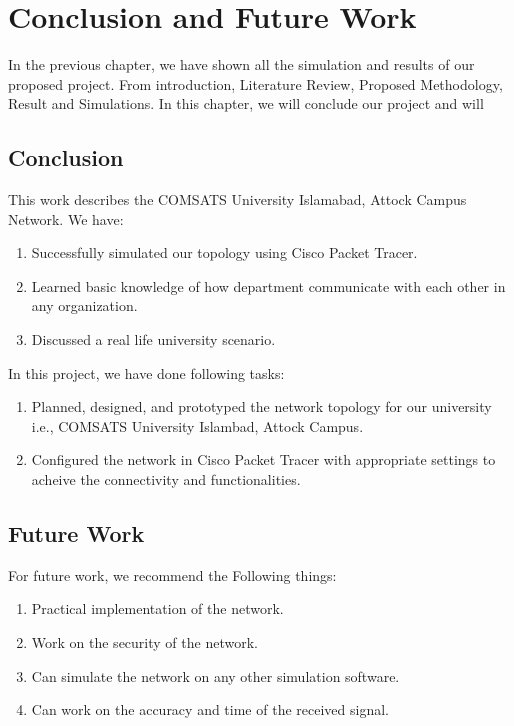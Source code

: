 \chapter{Conclusion and Future Work}
\label{chap5}
In the previous chapter, we have shown all the simulation and results of our proposed project. From introduction, Literature Review, Proposed Methodology, Result and Simulations. In this chapter, we will conclude our project and will
\section{Conclusion}
This work describes the COMSATS University Islamabad, Attock Campus Network. We have:
\begin{enumerate}
\item Successfully simulated our topology using Cisco Packet Tracer.
%
\item Learned basic knowledge of how department communicate with each other in any organization.
%
\item Discussed a real life university scenario.
%
\end{enumerate}
In this project, we have done following tasks:
\begin{enumerate}
\item Planned, designed, and prototyped the network topology for our university i.e., COMSATS University Islambad, Attock Campus.
%
\item Configured the network in Cisco Packet Tracer with appropriate settings to acheive the connectivity and functionalities.
%
\end{enumerate}

\section{Future Work}

For future work, we recommend the Following things:

\begin{enumerate}
\item Practical implementation of the network.
%
\item Work on the security of the network.
%
\item Can simulate the network on any other simulation software.
%
\item Can work on the accuracy and time of the received signal.
\end{enumerate}
